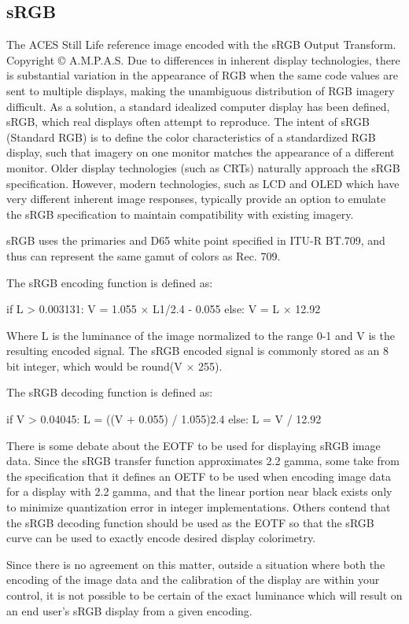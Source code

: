 \subsection{sRGB}

The ACES Still Life reference image encoded with the sRGB Output Transform.
Copyright © A.M.P.A.S.
Due to differences in inherent display technologies, there is substantial variation in the appearance of RGB when the same code values are sent to multiple displays, making the unambiguous distribution of RGB imagery difficult. As a solution, a standard idealized computer display has been defined, sRGB, which real displays often attempt to reproduce. The intent of sRGB (Standard RGB) is to define the color characteristics of a standardized RGB display, such that imagery on one monitor matches the appearance of a different monitor. Older display technologies (such as CRTs) naturally approach the sRGB specification. However, modern technologies, such as LCD and OLED which have very different inherent image responses, typically provide an option to emulate the sRGB specification to maintain compatibility with existing imagery.

sRGB uses the primaries and D65 white point specified in ITU-R BT.709, and thus can represent the same gamut of colors as Rec. 709.

The sRGB encoding function is defined as:

	if L > 0.003131:
            		V = 1.055 × L1/2.4 - 0.055
	else:
		V = L × 12.92

Where L is the luminance of the image normalized to the range 0-1 and V is the resulting encoded signal. The sRGB encoded signal is commonly stored as an 8 bit integer, which would be round(V × 255).

The sRGB decoding function is defined as:

	if V > 0.04045:
            		L = ((V + 0.055) / 1.055)2.4
	else:
		L = V / 12.92

There is some debate about the EOTF to be used for displaying sRGB image data. Since the sRGB transfer function approximates 2.2 gamma, some take from the specification that it defines an OETF to be used when encoding image data for a display with 2.2 gamma, and that the linear portion near black exists only to minimize quantization error in integer implementations. Others contend that the sRGB decoding function should be used as the EOTF so that the sRGB curve can be used to exactly encode desired display colorimetry.

Since there is no agreement on this matter, outside a situation where both the encoding of the image data and the calibration of the display are within your control, it is not possible to be certain of the exact luminance which will result on an end user's sRGB display from a given encoding.


